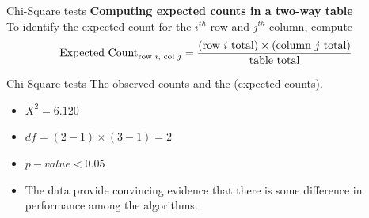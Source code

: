 \documentclass[12pt,a4paper]{beamer}
\begin{document}
			\begin{frame}{Chi-Square tests}
				\textbf{Computing expected counts in a two-way table}\\
				To identify the expected count for the $i^{th}$ row and $j^{th}$ column, compute
				$$\text{Expected Count}_{\text{row }i,\text{ col }j} = \frac{(\text{row $i$ total}) \times  (\text{column $j$ total})}{\text{table total}}\vspace{2mm}$$
			\end{frame}
				\begin{frame}{Chi-Square tests}
					The observed counts and the (expected counts).
					\begin{table}[h]
					\centering
					\end{table}
					\begin{itemize}
					\item $X^2 = 6.120$
					\item $df = (2-1)\times (3-1) = 2$
					\item $p-value<0.05$
					\item The data provide convincing evidence that there is some difference in performance among the algorithms.
				\end{itemize}
				\end{frame}
\end{document}
